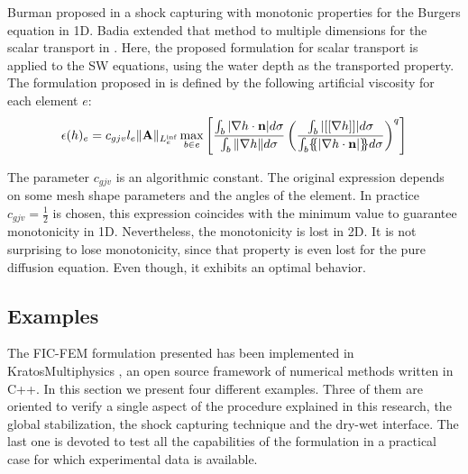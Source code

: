 Burman proposed in \cite{burman2007} a shock capturing with monotonic properties for the Burgers equation in 1D. Badia extended that method to multiple dimensions for the scalar transport in \cite{badia2014}. Here, the proposed formulation for scalar transport is applied to the SW equations, using the water depth as the transported property.
The formulation proposed in \cite{badia2014} is defined by the following artificial viscosity for each element $e$:
\begin{equation}
    \epsilon(h)_e = c_{gjv} l_e \Vert \mathbf{A}\Vert_{L^{\inf}_e}\max_{b\in e} \left[
        \frac{
            \int_b|\nabla h\cdot\mathbf{n}|d\sigma
        }{
            \int_b\Vert\nabla h\Vert d\sigma
        }
        \left(
            \frac{
                \int_b|[[\nabla h]]|d\sigma
            }{
                \int_b\{\mskip-5mu\{|\nabla h\cdot\mathbf{n}|\}\mskip-5mu\} d\sigma
            }
        \right)^q
    \right] 
\end{equation}

The parameter $c_{gjv}$ is an algorithmic constant. The original expression depends on some mesh shape parameters and the angles of the element. In practice $c_{gjv}=\frac{1}{2}$ is chosen, this expression coincides with the minimum value to guarantee monotonicity in 1D. Nevertheless, the monotonicity is lost in 2D. It is not surprising to lose monotonicity, since that property is even lost for the pure diffusion equation. Even though, it exhibits an optimal behavior.









\subsection{Examples}
\label{sec:examples}

The FIC-FEM formulation presented has been implemented in KratosMultiphysics \cite{dadvand2010, dadvand2013}, an open source framework of numerical methods written in C++.
In this section we present four different examples. Three of them are oriented to verify a single aspect of the procedure explained in this research, the global stabilization, the shock capturing technique and the dry-wet interface.
The last one is devoted to test all the capabilities of the formulation in a practical case for which experimental data is available.



